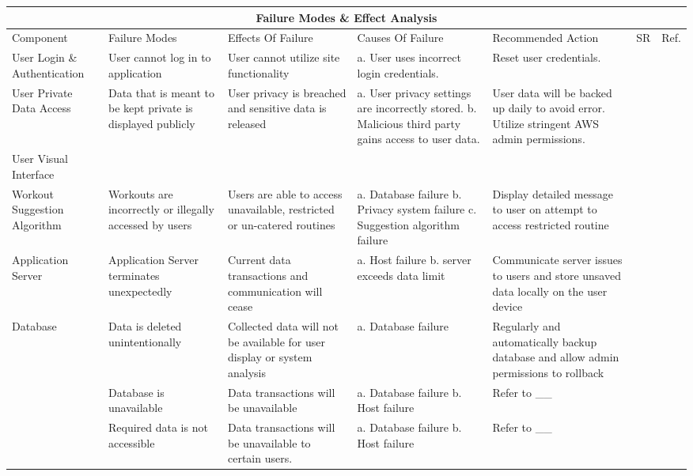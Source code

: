 \documentclass{article}
\begin{document}
	\begin{adjustwidth}{-3cm}{-1cm}
	\centering
	\noindent\begin{tabular}{ |p{3.3cm}||p{2.5cm}|p{3.2cm}|p{2cm}|p{3.3cm}|p{0.7cm}|p{0.7cm}| @{} }
		\hline
		\multicolumn{7}{|c|}{Failure Modes \& Effect Analysis} \\
		\hline
		Component & Failure Modes & Effects Of Failure & Causes Of Failure & Recommended Action & SR & Ref.\\
		\hline
		User Login \& Authentication& User cannot log in to application & User cannot utilize site functionality & 
			a. User uses incorrect login credentials.
			& 
			Reset user credentials.
			& &\\
		\hline
		User Private Data Access & Data that is meant to be kept private is displayed publicly & 
			User privacy is breached and sensitive data is released & 
				a. User privacy settings are incorrectly stored.
				\newline
				b. Malicious third party gains access to user data.
			& 
				User data will be backed up daily to avoid error. Utilize stringent AWS admin permissions.
			& &\\
		\hline
		User Visual Interface &  & & & & &\\
		\hline
		Workout Suggestion Algorithm& Workouts are incorrectly or illegally accessed by users& Users are able to access unavailable, restricted or un-catered routines & a. Database failure \newline b. Privacy system failure \newline c. Suggestion algorithm failure & Display detailed message to user on attempt to access restricted routine & &\\
		\hline
		Application Server& Application Server terminates unexpectedly & Current data transactions and communication will cease& a. Host failure \newline b. server exceeds data limit& Communicate server issues to users and store unsaved data locally on the user device & & \\
		\hline
		Database& Data is deleted unintentionally& Collected data will not be available for user display or system analysis& a. Database failure & Regularly and automatically backup database and allow admin permissions to rollback & &\\
		\cline{2-7}
		& Database is unavailable & Data transactions will be unavailable & a. Database failure \newline b. Host failure& Refer to \_\_ & &\\
		\cline{2-7}
		& Required data is not accessible &  Data transactions will be unavailable to certain users. & a. Database failure \newline b. Host failure & Refer to \_\_ & &\\
		\hline
	\end{tabular}
	\end{adjustwidth}
\end{document}
